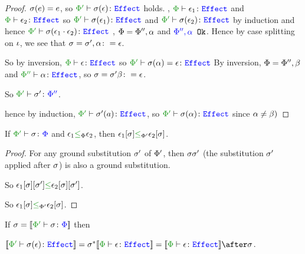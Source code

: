 \documentclass{report}
\begin{document}
\begin{framed}
    \begin{proof}
        \case{\eground}
        $\si(e) = e$, so $\wellformede{\P'}{\si(\e)}$ holds.
        \case{\ecompose}
        \bi, $\wellformede{\P}{\e_1}$ and $\wellformede{\P}{\e_2}$ so $\wellformede{\P'}{\si(\e_1)}$ and $\wellformede{\P'}{\si(\e_2)}$ by induction and hence $\wellformede{\P'}{\si(\e_1\dot\e_2)}$
        \case{\evar}
        \bi, $\P=\P'',\a$ and $\ok{\P'',\a}$. Hence by case splitting on $\i$, we see that $\si=\si', \a\setto\e$.
        
        So by inversion, $\wellformede{\P}{\e}$ so $\wellformede{\P'}{\si(\a)=\e}$
        \case{\eweaken}
        By inversion,  $\P=\P'', \b$ and $\wellformede{\P''}{\a}$, so $\si=\si'\b\setto\e$.
        
        So $\typerelation{\P'}{\si'}{\P''}$.
        
        hence by induction, $\wellformede{\P'}{\si'(a)}$, so $\wellformede{\P'}{\si(\a)}$ since $\a\neq\b)$
    \end{proof}
    
\end{framed}
\begin{theorem}
    If $\typerelation{\P'}{\si}{\P}$ and $\e_1\subeffectp\e_2$, then $\e_1\ssi\subeffect_{\P'}\e_2\ssi$.
\end{theorem}


\begin{framed}  
    \begin{proof}
        For any ground substitution $\si'$ of $\P'$, then $\si\si'$ (the substitution $\si'$ applied after $\si$) is also a ground substitution.
        
        So $\e_1\ssi\sub{\si'}\subeffect\e_2\ssi\sub{\si'}$. 
        
        So $\e_1\ssi\subeffect_{\P'}\e_2\ssi$.
        
    \end{proof}
\end{framed}

\begin{theorem}
    If $\si = \deno{\typerelation{\P'}{\si}{\P}}$ then 
    
    $\deno{\typerelation{\P'}{\si(\e)}{\effect}} = \si\star\deno{\typerelation{\P}{\e}{\effect}} = \deno{\typerelation{\P}{\e}{\effect}}\after\si$.
\end{theorem}
\end{document}
